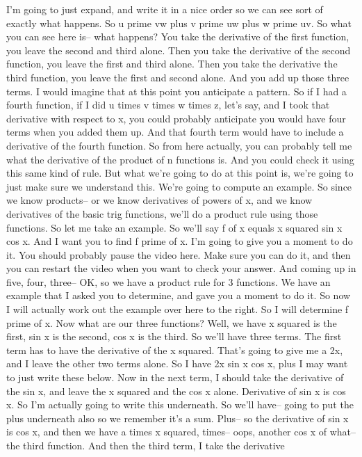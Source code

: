 \documentclass[pdftex, brazil, 12pt, twoside]{article}
\begin{document}
I'm going to just expand, and write it in a nice order
so we can see sort of exactly what happens.
So u prime vw plus v prime uw plus w prime uv.
So what you can see here is-- what happens?
You take the derivative of the first function,
you leave the second and third alone.
Then you take the derivative of the second function,
you leave the first and third alone.
Then you take the derivative the third function,
you leave the first and second alone.
And you add up those three terms.
I would imagine that at this point you anticipate a pattern.
So if I had a fourth function, if I
did u times v times w times z, let's say,
and I took that derivative with respect
to x, you could probably anticipate
you would have four terms when you added them up.
And that fourth term would have to include a derivative
of the fourth function.
So from here actually, you can probably
tell me what the derivative of the product of n functions is.
And you could check it using this same kind of rule.
But what we're going to do at this point is,
we're going to just make sure we understand this.
We're going to compute an example.
So since we know products-- or we know derivatives
of powers of x, and we know derivatives of the basic trig
functions, we'll do a product rule using those functions.
So let me take an example.
So we'll say f of x equals x squared sin x cos x.
And I want you to find f prime of x.
I'm going to give you a moment to do it.
You should probably pause the video here.
Make sure you can do it, and then you
can restart the video when you want to check your answer.
And coming up in five, four, three--
OK, so we have a product rule for 3 functions.
We have an example that I asked you to determine,
and gave you a moment to do it.
So now I will actually work out the example over here
to the right.
So I will determine f prime of x.
Now what are our three functions?
Well, we have x squared is the first, sin x is the second, cos
x is the third.
So we'll have three terms.
The first term has to have the derivative of the x squared.
That's going to give me a 2x, and I leave the other two terms
alone.
So I have 2x sin x cos x, plus I may
want to just write these below.
Now in the next term, I should take the derivative of the sin
x, and leave the x squared and the cos x alone.
Derivative of sin x is cos x.
So I'm actually going to write this underneath.
So we'll have-- going to put the plus underneath also
so we remember it's a sum.
Plus-- so the derivative of sin x is cos x,
and then we have a times x squared, times--
oops, another cos x of what--
the third function.
And then the third term, I take the derivative
\end{document}
